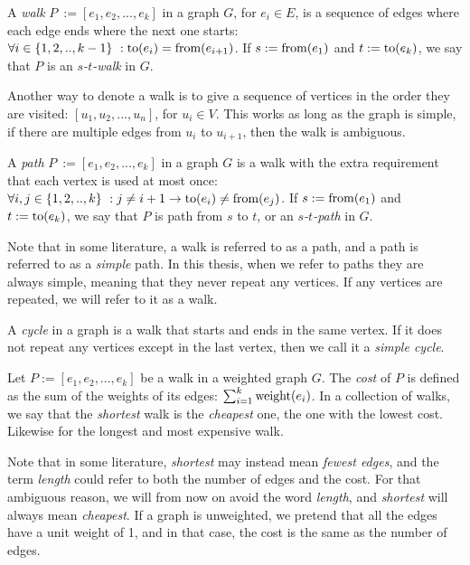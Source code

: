 \begin{definition}[Walk]
    A \emph{walk} $P~:= [e_1, e_2, ..., e_k]$ in a graph $G$, for $e_i \in E$, is a sequence of edges where each edge ends where the next one starts: $\forall i \in \{1,2,..,k-1\}~: \operatorname{to}(e_i) = \operatorname{from}(e_{i+1})$.
    If $s := \operatorname{from}(e_1)$ and $t := \operatorname{to}(e_k)$, we say that $P$ is an \emph{$s$-$t$-walk} in $G$.
\end{definition}

Another way to denote a walk is to give a sequence of vertices in the order they are visited: $[u_1, u_2, ..., u_n]$, for $u_i \in V$. This works as long as the graph is simple, if there are multiple edges from $u_i$ to $u_{i+1}$, then the walk is ambiguous.

\begin{definition}[Path]
    A \emph{path} $P~:= [e_1, e_2, ..., e_k]$ in a graph $G$ is a walk with the extra requirement that each vertex is used at most once: $\forall i, j \in \{1,2,..,k\}~: j \neq {i+1} \rightarrow \operatorname{to}(e_i) \neq \operatorname{from}(e_j)$.
    If $s := \operatorname{from}(e_1)$ and $t := \operatorname{to}(e_k)$, we say that $P$ is path from $s$ to $t$, or an \emph{$s$-$t$-path} in $G$.
\end{definition}

Note that in some literature, a walk is referred to as a path, and a path is referred to as a \emph{simple} path. In this thesis, when we refer to paths they are always simple, meaning that they never repeat any vertices. If any vertices are repeated, we will refer to it as a walk.    

\begin{definition}[Cycle]
    A \emph{cycle} in a graph is a walk that starts and ends in the same vertex. If it does not repeat any vertices except in the last vertex, then we call it a \emph{simple cycle}.
\end{definition}

\begin{definition}
    Let $P := [e_1, e_2, ..., e_k]$ be a walk in a weighted graph $G$. The \emph{cost} of $P$ is defined as the sum of the weights of its edges: $\sum_{i=1}^k \operatorname{weight}(e_i)$. In a collection of walks, we say that the \emph{shortest} walk is the \emph{cheapest} one, the one with the lowest cost. Likewise for the longest and most expensive walk. 
\end{definition}

Note that in some literature, \emph{shortest} may instead mean \emph{fewest edges}, and the term \emph{length} could refer to both the number of edges and the cost. For that ambiguous reason, we will from now on avoid the word \emph{length}, and \emph{shortest} will always mean \emph{cheapest}. If a graph is unweighted, we pretend that all the edges have a unit weight of 1, and in that case, the cost is the same as the number of edges.

